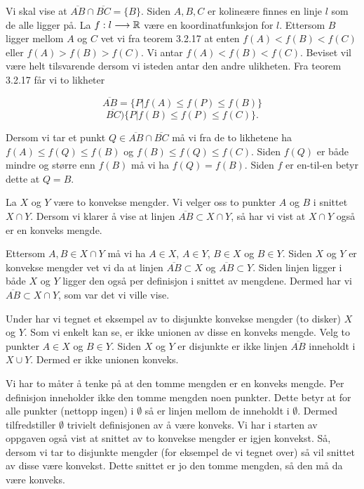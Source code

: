 \begin{oppgave}[3.2.24.d)]
  Vi skal vise at $\overline{AB}\cap \overline{BC} = \{B\}$. Siden $A, B, C$ er kolineære finnes en 
  linje $l$ som de alle ligger på. La $f:l\longrightarrow \mathbb{R}$ være en koordinatfunksjon for $l$. 
  Ettersom $B$ ligger mellom $A$ og $C$ vet vi fra teorem 3.2.17 at enten $f(A)<f(B)<f(C)$ eller 
  $f(A)>f(B)>f(C)$. Vi antar $f(A)<f(B)<f(C)$. Beviset vil være helt tilsvarende dersom vi isteden
  antar den andre ulikheten. Fra teorem 3.2.17 får vi to likheter

  $$ \overline{AB}=\{P|f(A)\leq f(P)\leq f(B)\} $$
  $$ \overline{BC})\{P|f(B)\leq f(P)\leq f(C)\} .$$

  Dersom vi tar et punkt $Q\in \overline{AB}\cap \overline{BC}$ må vi fra de to likhetene ha
  $ f(A)\leq f(Q)\leq f(B)$ og $f(B)\leq f(Q)\leq f(C)$. Siden $f(Q)$ er både mindre og større enn 
  $f(B)$ må vi ha $f(Q)=f(B)$. Siden $f$ er en-til-en betyr dette at $Q=B$. 
\end{oppgave}

\begin{oppgave}[3.3.1]
  La $X$ og $Y$ være to konvekse mengder. Vi velger oss to punkter $A$ og $B$ i snittet $X\cap Y$. 
  Dersom vi klarer å vise at linjen $\overline{AB}\subset X\cap Y$, så har vi vist at $X\cap Y$ også 
  er en konveks mengde. 

  Ettersom $A, B\in X\cap Y$ må vi ha $A\in X$, $A\in Y$, $B\in X$ og $B\in Y$. Siden $X$ og $Y$ er 
  konvekse mengder vet vi da at linjen $\overline{AB}\subset X$ og $\overline{AB}\subset Y$. Siden 
  linjen ligger i både $X$ og $Y$ ligger den også per definisjon i snittet av mengdene. Dermed har 
  vi $\overline{AB}\subset X\cap Y$, som var det vi ville vise. 

  Under har vi tegnet et eksempel av to disjunkte konvekse mengder (to disker) $X$ og $Y$. Som vi 
  enkelt kan se, er ikke unionen av disse en konveks mengde. Velg to punkter $A\in X$ og $B\in Y$. 
  Siden $X$ og $Y$ er disjunkte er ikke linjen $\overline{AB}$ inneholdt i $X\cup Y$. Dermed er 
  ikke unionen konveks. 

  \begin{figure}[H]
    \centering
    
  \end{figure}
  
  Vi har to måter å tenke på at den tomme mengden er en konveks mengde. Per definisjon inneholder 
  ikke den tomme mengden noen punkter. Dette betyr at for alle punkter (nettopp ingen) i $\emptyset$ 
  så er linjen mellom de inneholdt i $\emptyset$. Dermed tilfredstiller $\emptyset$ trivielt 
  definisjonen av å være konveks. Vi har i starten av oppgaven også vist at snittet av to konvekse 
  mengder er igjen konvekst. Så, dersom vi tar to disjunkte mengder (for eksempel de vi tegnet over)
  så vil snittet av disse være konvekst. Dette snittet er jo den tomme mengden, så den må da være 
  konveks. 
\end{oppgave}

